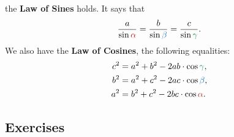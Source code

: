\documentclass[a4paper,11pt]{article}
\newcommand{\clr}{\textcolor{BrickRed}}
\newcommand{\clb}{\textcolor{RoyalBlue}}
\newcommand{\clg}{\textcolor{ForestGreen}}
\begin{document}
the \textbf{Law of Sines} holds. It says that
\[
 \frac{a}{\sin \clr{\alpha}} = \frac{b}{\sin \clb{\beta}} = \frac{c}{\sin
  \clg{\gamma}}.
\]
We also have the \textbf{Law of Cosines}, the following equalities:
\begin{equation*}
 \begin{split}
  c^2 &= a^2 + b^2 - 2ab \cdot \cos \clg{\gamma}, \\
  b^2 &= a^2 + c^2 - 2ac \cdot \cos \clb{\beta}, \\
  a^2 &= b^2 + c^2 - 2bc \cdot \cos \clr{\alpha}. \\
 \end{split}
\end{equation*}

\subsection*{Exercises}
\end{document}
